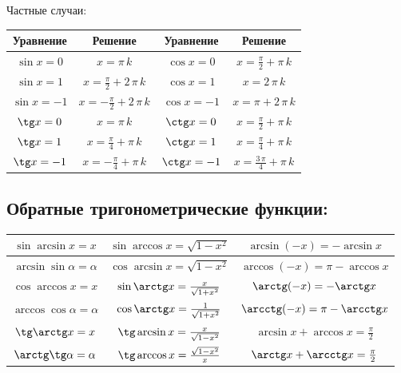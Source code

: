 Частные случаи:

\begin{tabu}[t]{||c|c||c|c||}
	\hline
		Уравнение & Решение & Уравнение & Решение \\
	\hline
		$ \sin x = 0 $ & 	$ x = \pi\, k $ & 				$ \cos x = 0 $ &	$ x = \frac{\pi}{2} + \pi\, k $ \\
	\hline
		$ \sin x = 1 $ & 	$ x = \frac{\pi}{2} + 2\, \pi\, k $ & 	$ \cos x = 1 $ & 	$ x = 2\, \pi\, k $ \\
	\hline
		$ \sin x = -1 $ & 	$ x = -\frac{\pi}{2} + 2\, \pi\, k $ & 	$ \cos x = -1 $ & 	$ x = \pi + 2\, \pi\, k $ \\
	\hline
		$ \tg x = 0 $ & 	$ x = \pi\, k $ & 				$ \ctg x = 0 $ & 	$ x = \frac{\pi}{2} + \pi\, k $ \\
	\hline
		$ \tg x = 1 $ & 	$ x = \frac{\pi}{4} + \pi\, k $ & 		$ \ctg x = 1 $ & 	$ x = \frac{\pi}{4} + \pi\, k $ \\
	\hline
		$ \tg x = -1 $ & 	$ x = -\frac{\pi}{4} + \pi\, k $ & 		$ \ctg x = -1 $ & 	$ x = \frac{3\, \pi}{4} + \pi\, k $ \\
	\hline
\end{tabu}

\subsection{Обратные тригонометрические функции:}

\begin{tabu}[t]{||c||c||c||}
	\hline
		$ \sin\arcsin x = x $            & $ \sin\arccos x = \sqrt{1-x^2} $          & $ \arcsin(-x) = -\arcsin x $              \\
	\hline
		$ \arcsin\sin\alpha = \alpha $   & $ \cos\arcsin x = \sqrt{1-x^2} $            & $ \arccos(-x) = \pi - \arccos x $         \\
	\hline
	\hline
		$ \cos\arccos x = x $            & $ \sin\arctg x = \frac{x}{\sqrt{1+x^2}} $ & $ \arctg(-x) = -\arctg x $                \\
	\hline
		$ \arccos\cos\alpha = \alpha $   & $ \cos\arctg x = \frac{1}{\sqrt{1+x^2}} $ & $ \arcctg(-x) = \pi - \arcctg x $         \\
	\hline
	\hline
		$ \tg\arctg x = x $              & $ \tg\arcsin x = \frac{x}{\sqrt{1-x^2}} $ & $ \arcsin x + \arccos x = \frac{\pi}{2} $ \\
	\hline
		$ \arctg\tg\alpha = \alpha $     & $ \tg\arccos x = \frac{\sqrt{1-x^2}}{x} $ & $ \arctg x + \arcctg x = \frac{\pi}{2} $  \\
	\hline
\end{tabu}

